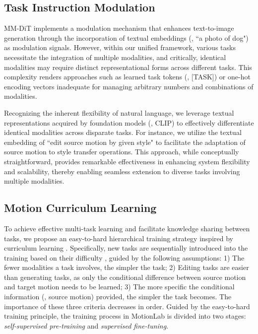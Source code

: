 \subsection{Task Instruction Modulation} \label{sec:tsim}
MM-DiT implements a %
modulation mechanism that enhances text-to-image generation through the incorporation of textual embeddings (\eg, ``a photo of dog") as modulation signals. However, within our unified framework, various tasks necessitate the integration of multiple modalities, and critically, identical modalities may require distinct representational forms across different tasks. This complexity renders approaches such as learned task tokens (\eg, [TASK]) or one-hot encoding vectors inadequate for managing arbitrary numbers and combinations of modalities.

Recognizing the inherent flexibility of natural language, we leverage textual representations acquired by foundation models (\eg, CLIP) to effectively differentiate identical modalities across disparate tasks. For instance, we utilize the textual embedding of ``edit source motion by given style" to facilitate the adaptation of source motion to style transfer operations. This approach, while conceptually straightforward, provides remarkable effectiveness in enhancing system flexibility and scalability, thereby enabling seamless extension to diverse tasks involving multiple modalities.

\vspace{-2mm}
\subsection{Motion Curriculum Learning} \label{sec:mcl}
To achieve effective multi-task learning and facilitate knowledge sharing between tasks, we propose an easy-to-hard hierarchical training strategy inspired by curriculum learning \cite{bengio2009curriculum}. Specifically, new tasks are sequentially introduced into the training based on their difficulty , guided by the following assumptions: 1) The fewer modalities a task involves, the simpler the task; 2) Editing tasks are easier than generating tasks, as only the conditional difference between source motion and target motion needs to be learned; 3) The more specific the conditional information (\eg, source motion) provided, the simpler the task becomes. The importance of these three criteria decreases in order. Guided by the easy-to-hard training principle, the training process in MotionLab is divided into two stages: \textit{self-supervised pre-training} and \textit{supervised fine-tuning}.


